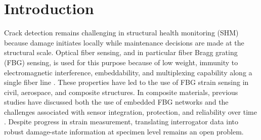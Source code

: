 \documentclass[notspecified,article,submit,pdftex,moreauthors]{Definitions/mdpi}
\begin{document}
\section{Introduction}

Crack detection remains challenging in structural health monitoring (SHM) because damage initiates locally while maintenance decisions are made at the structural scale. Optical fiber sensing, and in particular fiber Bragg grating (FBG) sensing, is used for this purpose because of low weight, immunity to electromagnetic interference, embeddability, and multiplexing capability along a single fiber line \cite{ye2014,yassin2024,golovastikov2025}. These properties have led to the use of FBG strain sensing in civil, aerospace, and composite structures. In composite materials, previous studies have discussed both the use of embedded FBG networks and the challenges associated with sensor integration, protection, and reliability over time \cite{kinet2014,gabardi2023}. Despite progress in strain measurement, translating interrogator data into robust damage-state information at specimen level remains an open problem.
\end{document}
